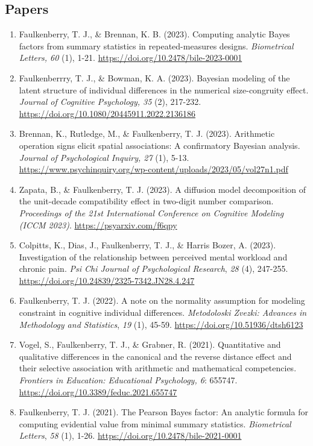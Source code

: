 \documentclass[article,10pt]{article}
\begin{document}
\subsection*{Papers}
\label{sec:orgaacc1e1}
\begin{enumerate}
\item Faulkenberry, T. J., \& Brennan, K. B. (2023). Computing analytic Bayes factors from summary statistics in repeated-measures designs. \emph{Biometrical Letters, 60} (1), 1-21. \url{https://doi.org/10.2478/bile-2023-0001}
\item Faulkenberrry, T. J., \& Bowman, K. A. (2023). Bayesian modeling of the latent structure of individual differences in the numerical size-congruity effect. \emph{Journal of Cognitive Psychology, 35} (2), 217-232. \url{https://doi.org/10.1080/20445911.2022.2136186}
\item Brennan, K., Rutledge, M., \& Faulkenberry, T. J. (2023). Arithmetic operation signs elicit spatial associations: A confirmatory Bayesian analysis. \emph{Journal of Psychological Inquiry, 27} (1), 5-13. \url{https://www.psychinquiry.org/wp-content/uploads/2023/05/vol27n1.pdf}
\item Zapata, B., \& Faulkenberry, T. J. (2023). A diffusion model decomposition of the unit-decade compatibility effect in two-digit number comparison. \emph{Proceedings of the 21st International Conference on Cognitive Modeling (ICCM 2023)}. \url{https://psyarxiv.com/f6qpy}
\item Colpitts, K., Dias, J., Faulkenberry, T. J., \& Harris Bozer, A. (2023). Investigation of the relationship between perceived mental workload and chronic pain. \emph{Psi Chi Journal of Psychological Research}, \emph{28} (4), 247-255. \url{https://doi.org/10.24839/2325-7342.JN28.4.247}
\item Faulkenberry, T. J. (2022). A note on the normality assumption for modeling constraint in cognitive individual differences. \emph{Metodoloski Zvezki: Advances in Methodology and Statistics}, \emph{19} (1), 45-59. \url{https://doi.org/10.51936/dtsh6123}
\item Vogel, S., Faulkenberry, T. J., \& Grabner, R. (2021). Quantitative and qualitative differences in the canonical and the reverse distance effect and their selective association with arithmetic and mathematical competencies. \emph{Frontiers in Education: Educational Psychology, 6}: 655747. \url{https://doi.org/10.3389/feduc.2021.655747}
\item Faulkenberry, T. J. (2021). The Pearson Bayes factor: An analytic formula for computing evidential value from minimal summary statistics. \emph{Biometrical Letters}, \emph{58} (1), 1-26. \url{https://doi.org/10.2478/bile-2021-0001}

\end{enumerate}
\end{document}
